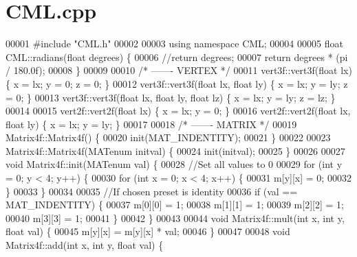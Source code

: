\section{C\+M\+L.\+cpp}
\label{_c_m_l_8cpp_source}

\begin{DoxyCode}
00001 \textcolor{preprocessor}{#include "CML.h"}
00002 
00003 \textcolor{keyword}{using namespace }CML;
00004 
00005 \textcolor{keywordtype}{float} CML::radians(\textcolor{keywordtype}{float} degrees) \{
00006     \textcolor{comment}{//return degrees;}
00007     \textcolor{keywordflow}{return} degrees * (pi / 180.0f);
00008 \}
00009 
00010 \textcolor{comment}{/* ------- VERTEX */}
00011 vert3f::vert3f(\textcolor{keywordtype}{float} lx)                     \{ x = lx; y = 0;  z = 0;  \}
00012 vert3f::vert3f(\textcolor{keywordtype}{float} lx, \textcolor{keywordtype}{float} ly)           \{ x = lx; y = ly; z = 0;  \}
00013 vert3f::vert3f(\textcolor{keywordtype}{float} lx, \textcolor{keywordtype}{float} ly, \textcolor{keywordtype}{float} lz) \{ x = lx; y = ly; z = lz; \}
00014 
00015 vert2f::vert2f(\textcolor{keywordtype}{float} lx)                     \{ x = lx; y = 0;  \}
00016 vert2f::vert2f(\textcolor{keywordtype}{float} lx, \textcolor{keywordtype}{float} ly)           \{ x = lx; y = ly; \}
00017     
00018 \textcolor{comment}{/* ------- MATRIX */}
00019 Matrix4f::Matrix4f() \{
00020     init(MAT\_INDENTITY);
00021 \}
00022 
00023 Matrix4f::Matrix4f(MATenum initval) \{
00024     init(initval);
00025 \}
00026 
00027 \textcolor{keywordtype}{void} Matrix4f::init(MATenum val) \{
00028     \textcolor{comment}{//Set all values to 0}
00029     \textcolor{keywordflow}{for} (\textcolor{keywordtype}{int} y = 0; y < 4; y++) \{
00030         \textcolor{keywordflow}{for} (\textcolor{keywordtype}{int} x = 0; x < 4; x++) \{
00031             m[y][x] = 0;
00032         \}
00033     \}
00034 
00035     \textcolor{comment}{//If chosen preset is identity}
00036     \textcolor{keywordflow}{if} (val == MAT\_INDENTITY) \{
00037         m[0][0] = 1;
00038         m[1][1] = 1;
00039         m[2][2] = 1;
00040         m[3][3] = 1;
00041     \}
00042 \}
00043 
00044 \textcolor{keywordtype}{void} Matrix4f::mult(\textcolor{keywordtype}{int} x, \textcolor{keywordtype}{int} y, \textcolor{keywordtype}{float} val) \{
00045     m[y][x] = m[y][x] * val;
00046 \}
00047 
00048 \textcolor{keywordtype}{void} Matrix4f::add(\textcolor{keywordtype}{int} x, \textcolor{keywordtype}{int} y, \textcolor{keywordtype}{float} val) \{

\end{DoxyCode}
